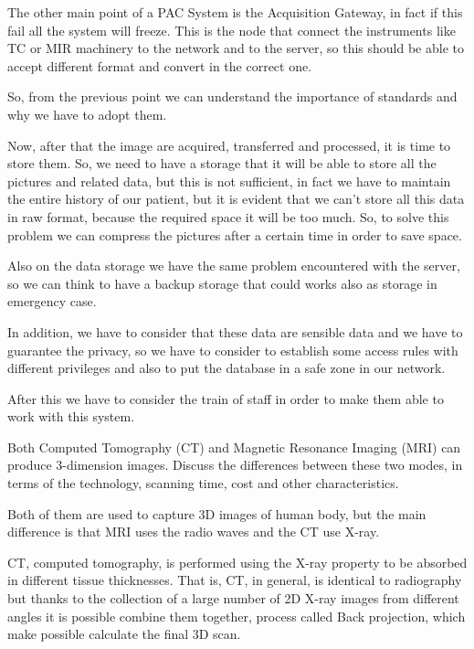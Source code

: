\documentclass[a4 paper,12pt]{article}
\begin{document}
        The other main point of a PAC System is the Acquisition Gateway, in fact if this fail all the system will freeze. This is the node that connect the instruments like TC or MIR machinery to the network and to the server, so this should be able to accept different format and convert in the correct one.
        
        So, from the previous point we can understand the importance of standards and why we have to adopt them.
    
        Now, after that the image are acquired, transferred and processed, it is time to store them. So, we need to have a storage that it will be able to store all the pictures and related data, but this is not sufficient, in fact we have to maintain the entire history of our patient, but it is evident that we can't store all this data in raw format, because the required space it will be too much. So, to solve this problem we can compress the pictures after a certain time in order to save space.
        
        Also on the data storage we have the same problem encountered with the server, so we can think to have a backup storage that could works also as storage in emergency case.
        
        In addition, we have to consider that these data are sensible data and we have to guarantee the privacy, so we have to consider to establish some access rules with different privileges and also to put the database in a safe zone in our network.
        
        After this we have to consider the train of staff in order to make them able to work with this system.
    
    Both Computed Tomography (CT) and Magnetic Resonance Imaging (MRI) can produce 3-dimension images. Discuss the differences between these two modes, in terms of the technology, scanning time, cost and other characteristics.
    
    \solution
    
        Both of them are used to capture 3D images of human body, but the main difference is that MRI uses the radio waves and the CT use X-ray.
        
        CT, computed tomography, is performed using the X-ray property to be absorbed in different tissue thicknesses. That is, CT, in general, is identical to radiography but thanks to the collection of a large number of 2D X-ray images from different angles it is possible combine them together, process called Back projection, which make possible calculate the final 3D scan.
        
\end{document}
